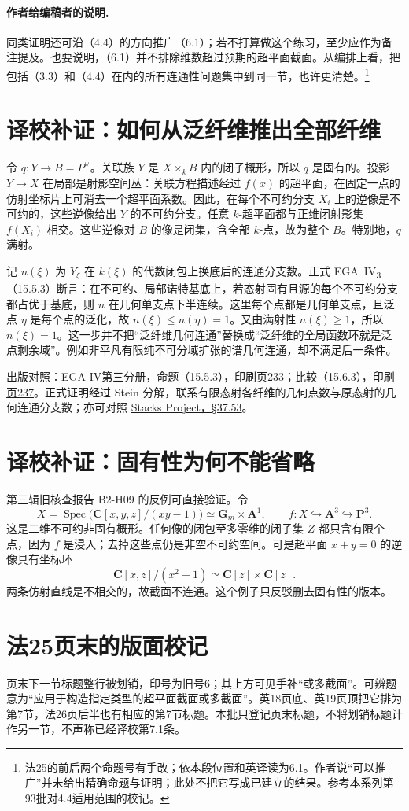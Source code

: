 \documentclass[openany,fontset=fandol]{ctexbook}
\DeclareMathOperator{\Spec}{Spec}
\begin{document}
\paragraph{作者给编稿者的说明.}
同类证明还可沿（4.4）的方向推广（6.1）；若不打算做这个练习，至少应作为备注提及。也要说明，（6.1）并不排除维数超过预期的超平面截面。从编排上看，把包括（3.3）和（4.4）在内的所有连通性问题集中到同一节，也许更清楚。\footnote{法25的前后两个命题号有手改；依本段位置和英译读为6.1。作者说“可以推广”并未给出精确命题与证明；此处不把它写成已建立的结果。参考本系列第93批对4.4适用范围的校记。}

\section*{译校补证：如何从泛纤维推出全部纤维}
令 $q:Y\to B=P^\vee$。关联族 $Y$ 是 $X\times_k B$ 内的闭子概形，所以 $q$ 是固有的。投影 $Y\to X$ 在局部是射影空间丛：关联方程描述经过 $f(x)$ 的超平面，在固定一点的仿射坐标片上可消去一个超平面系数。因此，在每个不可约分支 $X_i$ 上的逆像是不可约的，这些逆像给出 $Y$ 的不可约分支。任意 $k$-超平面都与正维闭射影集 $f(X_i)$ 相交。这些逆像对 $B$ 的像是闭集，含全部 $k$-点，故为整个 $B$。特别地，$q$ 满射。

记 $n(\xi)$ 为 $Y_\xi$ 在 $k(\xi)$ 的代数闭包上换底后的连通分支数。正式 EGA~IV\textsubscript{3}（15.5.3）断言：在不可约、局部诺特基底上，若态射固有且源的每个不可约分支都占优于基底，则 $n$ 在几何单支点下半连续。这里每个点都是几何单支点，且泛点 $\eta$ 是每个点的泛化，故 $n(\xi)\leq n(\eta)=1$。又由满射性 $n(\xi)\ge1$，所以 $n(\xi)=1$。这一步并不把“泛纤维几何连通”替换成“泛纤维的全局函数环就是泛点剩余域”。例如非平凡有限纯不可分域扩张的谱几何连通，却不满足后一条件。

出版对照：\href{https://www.numdam.org/item/PMIHES_1966__28__5_0/}{EGA IV第三分册，命题（15.5.3），印刷页233；比较（15.6.3），印刷页237}。正式证明经过 Stein 分解，联系有限态射各纤维的几何点数与原态射的几何连通分支数；亦可对照 \href{https://stacks.math.columbia.edu/tag/03GX}{Stacks Project，§37.53}。

\section*{译校补证：固有性为何不能省略}
第三辑旧核查报告 B2-H09 的反例可直接验证。令
\[
 X=\Spec\bigl(\mathbf C[x,y,z]/(xy-1)\bigr)
   \simeq \mathbf G_m\times\mathbf A^1,
 \qquad
 f:X\hookrightarrow\mathbf A^3\hookrightarrow\mathbf P^3.
\]
这是二维不可约非固有概形。任何像的闭包至多零维的闭子集 $Z$ 都只含有限个点，因为 $f$ 是浸入；去掉这些点仍是非空不可约空间。可是超平面 $x+y=0$ 的逆像具有坐标环
\[
 \mathbf C[x,z]/(x^2+1)\simeq \mathbf C[z]\times\mathbf C[z] .
\]
两条仿射直线是不相交的，故截面不连通。这个例子只反驳删去固有性的版本。

\section*{法25页末的版面校记}
页末下一节标题整行被划销，印号为旧号6；其上方可见手补“或多截面”。可辨题意为“应用于构造指定类型的超平面截面或多截面”。英18页底、英19页顶把它排为第7节，法26页后半也有相应的第7节标题。本批只登记页末标题，不将划销标题计作另一节，不声称已经译校第7.1条。
\end{document}
